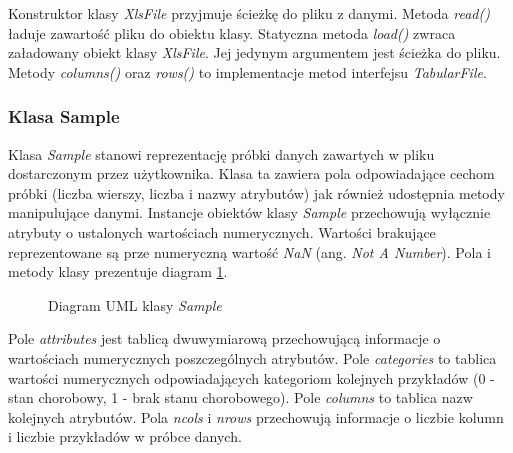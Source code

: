 \documentclass[../thesis.tex]{subfiles}
\begin{document}
Konstruktor klasy \emph{XlsFile} przyjmuje ścieżkę do pliku z danymi. Metoda \emph{read()} ładuje zawartość pliku do obiektu klasy. Statyczna metoda \emph{load()} zwraca załadowany obiekt klasy \emph{XlsFile}. Jej jedynym argumentem jest ścieżka do pliku. Metody \emph{columns()} oraz \emph{rows()} to implementacje metod interfejsu \emph{TabularFile}.

\subsubsection{Klasa Sample}

Klasa \emph{Sample} stanowi reprezentację próbki danych zawartych w pliku dostarczonym przez użytkownika. Klasa ta zawiera pola odpowiadające cechom próbki (liczba wierszy, liczba i nazwy atrybutów) jak również udostępnia metody manipulujące danymi. Instancje obiektów klasy \emph{Sample} przechowują wyłącznie atrybuty o ustalonych wartościach numerycznych. Wartości brakujące reprezentowane są prze numeryczną wartość \emph{NaN} (ang.\emph{ Not A Number}). Pola i metody klasy prezentuje diagram \ref{proj:diagram_sample}.

\begin{figure}[h]
\centering
{}
\caption{Diagram UML klasy \emph{Sample}}
\label{proj:diagram_sample}
\end{figure}

Pole \emph{attributes} jest tablicą dwuwymiarową przechowującą informacje o wartościach numerycznych poszczególnych atrybutów. Pole \emph{categories} to tablica wartości numerycznych odpowiadających kategoriom kolejnych przykładów (0 - stan chorobowy, 1 - brak stanu chorobowego). Pole \emph{columns} to tablica nazw kolejnych atrybutów. Pola \emph{ncols} i \emph{nrows} przechowują informacje o liczbie kolumn i liczbie przykładów w próbce danych.
\end{document}
